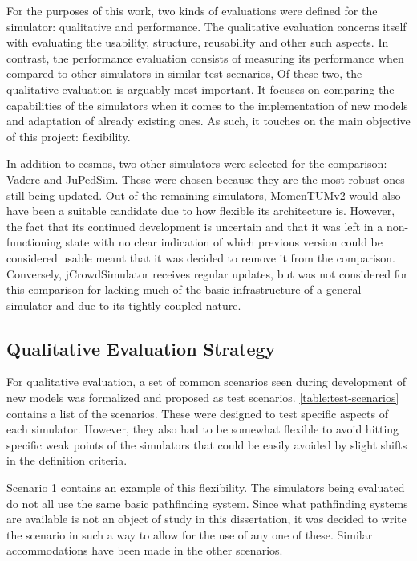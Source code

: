 \documentclass[twoside, 11pt]{article}
\begin{document}
For the purposes of this work, two kinds of evaluations were defined for the simulator: qualitative and performance. The qualitative evaluation concerns itself with evaluating the usability, structure, reusability and other such aspects. In contrast, the performance evaluation consists of measuring its performance when compared to other simulators in similar test scenarios,  Of these two, the qualitative evaluation is arguably most important. It focuses on comparing the capabilities of the simulators when it comes to the implementation of new models and adaptation of already existing ones. As such, it touches on the main objective of this project: flexibility. 

In addition to \gls{ecsmos}, two other simulators were selected for the comparison: Vadere and JuPedSim. These were chosen because they are the most robust ones still being updated. Out of the remaining simulators, MomenTUMv2 would also have been a suitable candidate due to how flexible its architecture is. However, the fact that its continued development is uncertain and that it was left in a non-functioning state with no clear indication of which previous version could be considered usable meant that it was decided to remove it from the comparison. Conversely, jCrowdSimulator receives regular updates, but was not considered for this comparison for lacking much of the basic infrastructure of a general simulator and due to its tightly coupled nature.

\subsection{Qualitative Evaluation Strategy} \label{sec:qualitative-evaluation}

For qualitative evaluation, a set of common scenarios seen during development of new models was formalized and proposed as test scenarios. \autoref{table:test-scenarios} contains a list of the scenarios. These were designed to test specific aspects of each simulator. However, they also had to be somewhat flexible to avoid hitting specific weak points of the simulators that could be easily avoided by slight shifts in the definition criteria. 

Scenario 1 contains an example of this flexibility. The simulators being evaluated do not all use the same basic pathfinding system. Since what pathfinding systems are available is not an object of study in this dissertation, it was decided to write the scenario in such a way to allow for the use of any one of these. Similar accommodations have been made in the other scenarios. 
\end{document}
